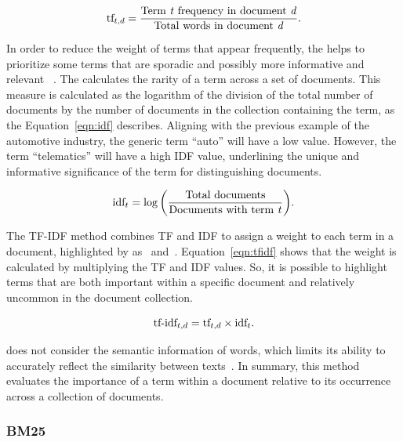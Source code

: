 \begin{equation}
    \textup{tf}_{t,d} = \frac{\text{Term \textit{t} frequency in document \textit{d}}}{\text{Total words in document \textit{d}}}.
    \label{eqn:tf}
\end{equation}

In order to reduce the weight of terms that appear frequently, the {\idf} helps to prioritize some terms that are sporadic and possibly more informative and relevant~\cite{liang_research_2022} . The {\idf} calculates the rarity of a term across a set of documents. This measure is calculated as the logarithm of the division of the total number of documents by the number of documents in the collection containing the term, as the Equation~\ref{eqn:idf} describes. Aligning with the previous example of the automotive industry, the generic term ``auto'' will have a low {\idf} value. However, the term ``telematics'' will have a high IDF value, underlining the unique and informative significance of the term for distinguishing documents.

\begin{equation}
    \textup{idf}_{t} = \log\bigg(\frac{\text{Total documents}}{\text{Documents with term \textit{t}}}\bigg).
    \label{eqn:idf}
\end{equation}

The TF-IDF method combines TF and IDF to assign a weight to each term in a document, highlighted by as~\citet{manning_introduction_2009} and~\citet{lan_research_2022}. Equation~\ref{eqn:tfidf} shows that the weight is calculated by multiplying the TF and IDF values. So, it is possible to highlight terms that are both important within a specific document and relatively uncommon in the document collection.

\begin{equation}
    \textup{tf-idf}_{t,d} = \textup{tf}_{t,d} \times \textup{idf}_{t}.
    \label{eqn:tfidf}
\end{equation}

{\tfidf} does not consider the semantic information of words, which limits its ability to accurately reflect the similarity between texts~\cite{lan_research_2022}. In summary, this {\ir} method evaluates the importance of a term within a document relative to its occurrence across a collection of documents.


\subsubsection{BM25}
\label{bm25}

